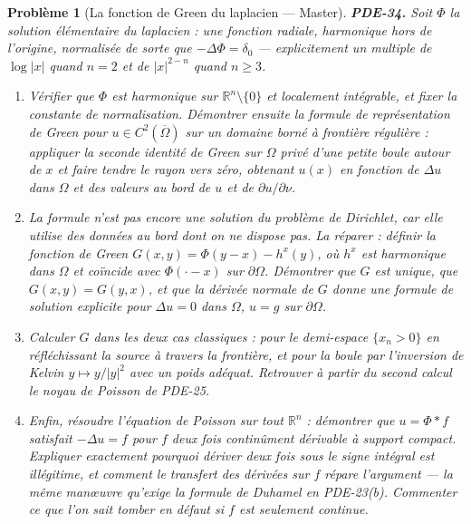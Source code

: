 \documentclass[11pt]{article}
\newtheorem{problem}{Problème}
\begin{document}
\begin{problem}[{La fonction de Green du laplacien --- Master}]
\textbf{PDE-34.} Soit $\Phi$ la solution élémentaire du laplacien : une fonction radiale,
harmonique hors de l'origine, normalisée de sorte que $-\Delta \Phi = \delta_0$ --- explicitement
un multiple de $\log|x|$ quand $n = 2$ et de $|x|^{2-n}$ quand $n \ge 3$.
\begin{enumerate}
\item[(a)] Vérifier que $\Phi$ est harmonique sur $\mathbb{R}^n \setminus \{0\}$ et localement
intégrable, et fixer la constante de normalisation. Démontrer ensuite la formule de représentation
de Green pour $u \in C^2(\overline{\Omega})$ sur un domaine borné à frontière régulière :
appliquer la seconde identité de Green sur $\Omega$ privé d'une petite boule autour de $x$ et
faire tendre le rayon vers zéro, obtenant $u(x)$ en fonction de $\Delta u$ dans $\Omega$ et
des valeurs au bord de $u$ et de $\partial u/\partial \nu$.
\item[(b)] La formule n'est pas encore une solution du problème de Dirichlet, car elle utilise des
données au bord dont on ne dispose pas. La réparer : définir la fonction de Green
$G(x,y) = \Phi(y-x) - h^x(y)$, où $h^x$ est harmonique dans $\Omega$ et coïncide avec
$\Phi(\cdot - x)$ sur $\partial\Omega$. Démontrer que $G$ est unique, que
$G(x,y) = G(y,x)$, et que la dérivée normale de $G$ donne une formule de solution explicite
pour $\Delta u = 0$ dans $\Omega$, $u = g$ sur $\partial\Omega$.
\item[(c)] Calculer $G$ dans les deux cas classiques : pour le demi-espace $\{x_n > 0\}$ en
réfléchissant la source à travers la frontière, et pour la boule par l'inversion de Kelvin
$y \mapsto y/|y|^2$ avec un poids adéquat. Retrouver à partir du second calcul le noyau de
Poisson de PDE-25.
\item[(d)] Enfin, résoudre l'équation de Poisson sur tout $\mathbb{R}^n$ : démontrer que
$u = \Phi * f$ satisfait $-\Delta u = f$ pour $f$ deux fois continûment dérivable à support
compact. Expliquer exactement pourquoi dériver deux fois sous le signe intégral est illégitime, et
comment le transfert des dérivées sur $f$ répare l'argument --- la même man\oe{}uvre qu'exige la
formule de Duhamel en PDE-23(b). Commenter ce que l'on sait tomber en défaut si $f$ est
seulement continue.
\end{enumerate}

\end{problem}
\end{document}
